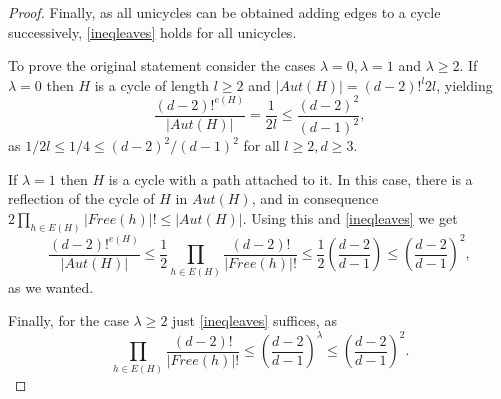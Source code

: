 \documentclass[11pt,notitlepage,a4paper]{article}
\theoremstyle{definition}
\begin{document}
\begin{proof}
	Finally, as all unicycles can be obtained adding edges
	to a cycle successively, \cref{ineqleaves} holds for all
	unicycles. \par
	To prove the original statement consider the cases 
	$\lambda=0, \lambda=1$ and $\lambda\geq 2$. If 
	$\lambda=0$ then $H$ is a cycle of length $l\geq 2$ 
	and $|Aut(H)|=(d-2)!^l 2l$, yielding
	\[ \frac{(d-2)!^{e(H)}}{|Aut(H)|}=\frac{1}{2l} 
	\leq \frac{(d-2)^2}{(d-1)^2},\]
	as $1/2l\leq 1/4 \leq (d-2)^2/(d-1)^2$ for all 
	$l\geq 2, d\geq 3$.
	\par
	If $\lambda=1$ then $H$ is a cycle with a path attached
	to it. In this case, there is a reflection of the cycle 
	of $H$ in $Aut(H)$, and in consequence 
	$2\prod_{h\in E(H)} |Free(h)|! \leq |Aut(H)|$. Using this
	and \cref{ineqleaves} we get
	\[ \frac{(d-2)!^{e(H)}}{|Aut(H)|}\leq \frac{1}{2}
	\prod_{h\in E(H)} \frac{(d-2)!}{|Free(h)|!}\leq
	\frac{1}{2} \left( \frac{d-2}{d-1}\right)\leq
	\left( \frac{d-2}{d-1}\right)^2,	
	\]
	as we wanted.\par
	Finally, for the case $\lambda \geq 2$ just \cref{ineqleaves}
	suffices, as
	\[
	\prod_{h\in E(H)} \frac{(d-2)!}{|Free(h)|!}\leq
	\left( \frac{d-2}{d-1}\right)^\lambda \leq
	\left( \frac{d-2}{d-1}\right)^2.	
	\]
	 
	
	
	
	
	
\end{proof} 
 
\end{document}

